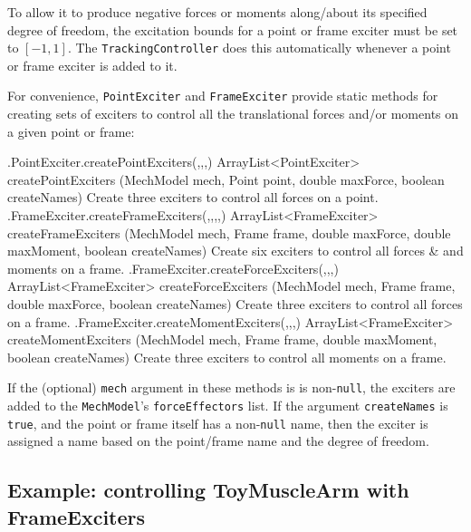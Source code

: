 To allow it to produce negative forces or moments along/about its specified
degree of freedom, the excitation bounds for a point or frame exciter
must be set to $[-1,1]$. The {\tt TrackingController} does this
automatically whenever a point or frame exciter is added to it.

For convenience, {\tt PointExciter} and {\tt FrameExciter} provide static
methods for creating sets of exciters to control all the translational
forces and/or moments on a given point or frame:
%
\begin{methodtable}{0.6}{0.4}
\midline
%
\methodentry
{\inverse.PointExciter.createPointExciters(,,,)}%
{ArrayList<PointExciter> createPointExciters (MechModel mech,\brh
Point point, double maxForce, boolean createNames)}%
{Create three exciters to control all forces on a point.}%
%
\methodspace{0.5em}%
\methodentry
{\inverse.FrameExciter.createFrameExciters(,,,,)}%
{ArrayList<FrameExciter> createFrameExciters (\brh MechModel mech,
Frame frame, double maxForce, \brh double maxMoment, boolean createNames)}%
{Create six exciters to control all forces \& and moments on a frame.}%
%
\methodspace{0.5em}%
\methodentry
{\inverse.FrameExciter.createForceExciters(,,,)}%
{ArrayList<FrameExciter> createForceExciters (MechModel mech,\brh
Frame frame, double maxForce, boolean createNames)}%
{Create three exciters to control all forces on a frame.}%
%
\methodspace{0.5em}%
\methodentry
{\inverse.FrameExciter.createMomentExciters(,,,)}%
{ArrayList<FrameExciter> createMomentExciters (\brh MechModel mech,
Frame frame, \brh double maxMoment, boolean createNames)}%
{Create three exciters to control all moments on a frame.}%
%
\midline
\end{methodtable}
%
If the (optional) {\tt mech} argument in these methods is
is non-{\tt null}, the exciters are added to
the {\tt MechModel}'s {\tt forceEffectors} list.
If the argument {\tt createNames} is {\tt true},
and the point or frame itself has a non-{\tt null} name,
then the exciter is assigned a name based on the point/frame name
and the degree of freedom.

\subsection{Example: controlling ToyMuscleArm with FrameExciters}


